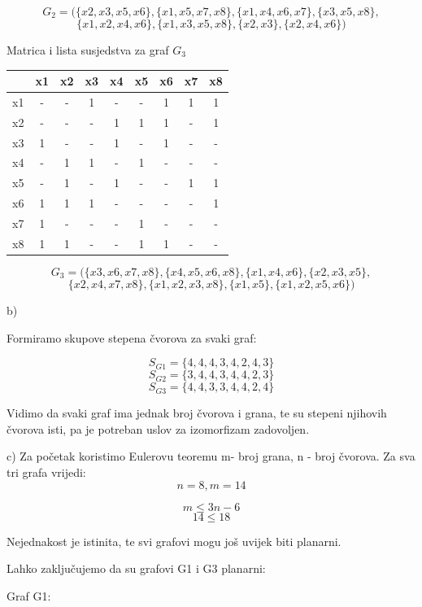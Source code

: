 \documentclass[12pt]{article}
\begin{document}
$$G_2 = (\{ x2, x3, x5, x6 \}, \{x1, x5, x7, x8\}, \{x1, x4, x6, x7\}, \{x3, x5, x8\}, $$
$$\{ x1, x2, x4, x6\}, \{x1, x3, x5, x8 \}, \{x2, x3\}, \{x2, x4, x6\})$$

Matrica i lista susjedstva za graf $G_3$

\begin{tabular}{ | c || c  | c | c | c | c | c | c | c | }
\hline
 & x1 & x2 & x3 & x4 & x5 & x6 & x7 & x8\\
 \hline
 \hline
x1 & - & - & 1 & - & - & 1 & 1 & 1\\
 \hline
x2 & - & - & - & 1 & 1 & 1 & - & 1\\
 \hline
x3 & 1 & - & - & 1 & - & 1 & - & -\\
 \hline
x4 & - & 1 & 1 & - & 1 & - & - & -\\
 \hline
x5 & - & 1 & - & 1 & - & - & 1 & 1\\
 \hline
x6 & 1 & 1 & 1 & - & - & - & - & 1\\
 \hline
x7 & 1 & - & - & - & 1 & - & - & -\\
 \hline
x8 & 1 & 1 & - & - & 1 & 1 & - & -\\
 \hline
\end{tabular}

$$G_3 = (\{ x3, x6, x7, x8\}, \{ x4, x5, x6, x8\}, \{x1, x4, x6\}, \{x2, x3, x5\}, $$
$$\{  x2, x4, x7, x8\}, \{x1, x2, x3, x8 \}, \{x1, x5\}, \{x1, x2, x5, x6\})$$

b)

Formiramo skupove stepena čvorova za svaki graf:

$$S_{G1} = \{ 4, 4, 4, 3, 4, 2, 4, 3\}$$
$$S_{G2} = \{ 3, 4, 4, 3, 4, 4, 2, 3\}$$
$$S_{G3} = \{4, 4, 3, 3, 4, 4, 2, 4\}$$

Vidimo da svaki graf ima jednak broj čvorova i grana, te su stepeni njihovih čvorova isti, pa je potreban uslov za izomorfizam zadovoljen.

c)
Za početak koristimo Eulerovu teoremu m- broj grana, n - broj čvorova.
Za sva tri grafa vrijedi:
$$n = 8, m = 14$$ 

$$m \leq 3n - 6$$
$$ 14 \leq 18$$

Nejednakost je istinita, te svi grafovi mogu još uvijek biti planarni.

Lahko zaključujemo da su grafovi G1 i G3 planarni:

Graf G1:
\end{document}
